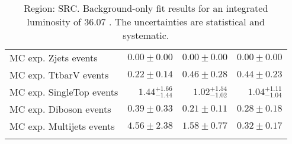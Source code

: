 \begin{table}
\begin{center}
{\begin{tabular*}{\textwidth}{@{\extracolsep{\fill}}lrrr}
        MC exp. Zjets events         & $0.00 \pm 0.00$          & $0.00 \pm 0.00$          & $0.00 \pm 0.00$              \\
        MC exp. TtbarV events         & $0.22 \pm 0.14$          & $0.46 \pm 0.28$          & $0.44 \pm 0.23$              \\
        MC exp. SingleTop events         & $1.44_{-1.44}^{+1.66}$          & $1.02_{-1.02}^{+1.54}$          & $1.04_{-1.04}^{+1.11}$              \\
        MC exp. Diboson events         & $0.39 \pm 0.33$          & $0.21 \pm 0.11$          & $0.28 \pm 0.18$              \\
        MC exp. Multijets events         & $4.56 \pm 2.38$          & $1.58 \pm 0.77$          & $0.32 \pm 0.17$              \\
\noalign{\smallskip}\hline\noalign{\smallskip}
\end{tabular*}
}
\end{center}
\caption{Region: SRC. Background-only fit results for an integrated luminosity of 36.07 \ifb. The uncertainties are statistical and systematic.
}
\label{table.bkgonly.SRC1to3}
\end{table}
%
